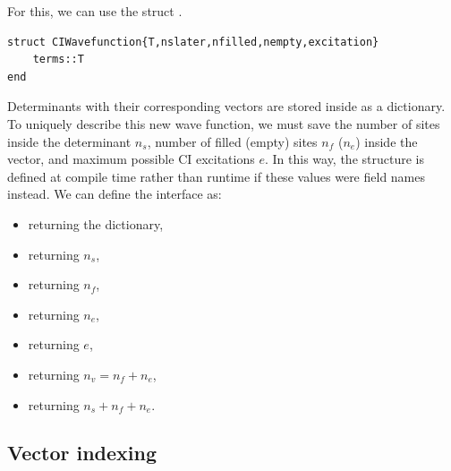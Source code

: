For this, we can use the struct .
\begin{verbatim}
struct CIWavefunction{T,nslater,nfilled,nempty,excitation}
    terms::T
end
\end{verbatim}
Determinants with their corresponding vectors are stored
inside  as a dictionary.
To uniquely describe this new wave function,
we must save the number of sites inside the determinant $n_s$,
number of filled (empty) sites $n_f$ ($n_e$) inside the vector,
and maximum possible CI excitations $e$.
In this way, the structure is defined at compile time rather than
runtime if these values were field names instead.
We can define the interface as:
\begin{itemize}
    \item {} returning the dictionary,
    \item {} returning $n_s$,
    \item {} returning $n_f$,
    \item {} returning  $n_e$,
    \item {} returning $e$,
    \item {} returning $n_v = n_f + n_e$,
    \item {} returning $n_s + n_f + n_e$.
\end{itemize}

\subsection{Vector indexing}
\label{subsec:vector-indexing}

